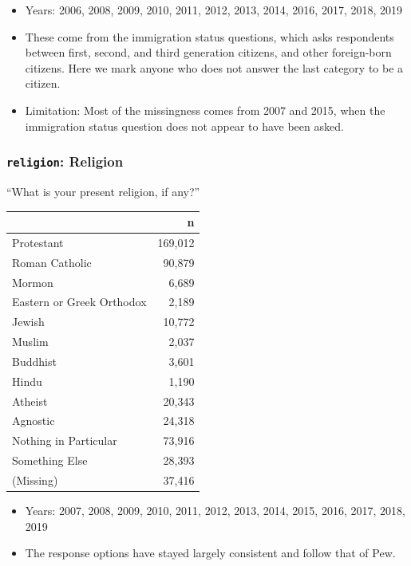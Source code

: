 \documentclass[10pt,article,oneside]{memoir}
\theoremstyle{definition}
\begin{document}
\begin{itemize}
\tightlist
\item
  Years: 2006, 2008, 2009, 2010, 2011, 2012, 2013, 2014, 2016, 2017,
  2018, 2019
\item
  These come from the immigration status questions, which asks
  respondents between first, second, and third generation citizens, and
  other foreign-born citizens. Here we mark anyone who does not answer
  the last category to be a citizen.
\item
  Limitation: Most of the missingness comes from 2007 and 2015, when the
  immigration status question does not appear to have been asked.
\end{itemize}

\hypertarget{religion-religion}{%
\subsubsection{\texorpdfstring{\texttt{religion}:
Religion}{religion: Religion}}\label{religion-religion}}

``What is your present religion, if any?''

\begin{table}[H]
\centering
\begin{tabular}{lr}
\toprule
 & n\\
\midrule
Protestant & 169,012\\
Roman Catholic & 90,879\\
Mormon & 6,689\\
Eastern or Greek Orthodox & 2,189\\
Jewish & 10,772\\
Muslim & 2,037\\
Buddhist & 3,601\\
Hindu & 1,190\\
Atheist & 20,343\\
Agnostic & 24,318\\
Nothing in Particular & 73,916\\
Something Else & 28,393\\
(Missing) & 37,416\\
\bottomrule
\end{tabular}
\end{table}

\begin{itemize}
\tightlist
\item
  Years: 2007, 2008, 2009, 2010, 2011, 2012, 2013, 2014, 2015, 2016,
  2017, 2018, 2019
\item
  The response options have stayed largely consistent and follow that of
  Pew.
\end{itemize}
\end{document}
